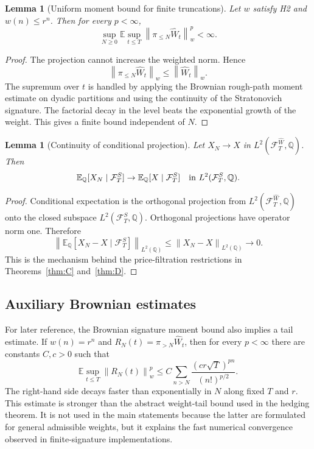 \documentclass[11pt,oneside]{article}
\theoremstyle{plain}
\newtheorem{lemma}[theorem]{Lemma}
\theoremstyle{definition}
\theoremstyle{remark}
\newcommand{\E}{\mathbb{E}}
\newcommand{\Q}{\mathbb{Q}}
\newcommand{\cW}{\widehat W}
\newcommand{\FWh}{\mathcal F^{\widehat W}}
\newcommand{\FS}{\mathcal F^S}
\newcommand{\norm}[1]{\left\lVert #1\right\rVert}
\begin{document}
\begin{lemma}[Uniform moment bound for finite truncations]
\label{lem:uniform-truncation-moment-app}
Let $w$ satisfy H2 and $w(n)\leq r^n$. Then for every $p<\infty$,
\[
\sup_{N\geq0}\E\sup_{t\leq T}\norm{\pi_{\leq N}\cW_t}_w^p<\infty.
\]
\end{lemma}

\begin{proof}
The projection cannot increase the weighted norm. Hence
\[
\norm{\pi_{\leq N}\cW_t}_w\leq\norm{\cW_t}_w.
\]
The supremum over $t$ is handled by applying the Brownian rough-path moment estimate on dyadic partitions and using the continuity of the Stratonovich signature. The factorial decay in the level beats the exponential growth of the weight. This gives a finite bound independent of $N$.
\end{proof}

\begin{lemma}[Continuity of conditional projection]
\label{lem:conditional-projection-continuity}
Let $X_N\to X$ in $L^2(\FWh_T,\Q)$. Then
\[
\E_\Q[X_N\mid\FS_T]\to\E_\Q[X\mid\FS_T]
\quad\hbox{in }L^2(\FS_T,\Q).
\]
\end{lemma}

\begin{proof}
Conditional expectation is the orthogonal projection from $L^2(\FWh_T,\Q)$ onto the closed subspace $L^2(\FS_T,\Q)$. Orthogonal projections have operator norm one. Therefore
\[
\norm{\E_\Q[X_N-X\mid\FS_T]}_{L^2(\Q)}\leq \norm{X_N-X}_{L^2(\Q)}\to0.
\]
This is the mechanism behind the price-filtration restrictions in Theorems~\ref{thm:C} and~\ref{thm:D}.
\end{proof}

\subsection*{Auxiliary Brownian estimates}
For later reference, the Brownian signature moment bound also implies a tail estimate. If $w(n)=r^n$ and $R_N(t)=\pi_{>N}\cW_t$, then for every $p<\infty$ there are constants $C,c>0$ such that
\[
\E\sup_{t\leq T}\norm{R_N(t)}_w^p\leq C\sum_{n>N}\frac{(cr\sqrt T)^{pn}}{(n!)^{p/2}}.
\]
The right-hand side decays faster than exponentially in $N$ along fixed $T$ and $r$. This estimate is stronger than the abstract weight-tail bound used in the hedging theorem. It is not used in the main statements because the latter are formulated for general admissible weights, but it explains the fast numerical convergence observed in finite-signature implementations.
\end{document}
